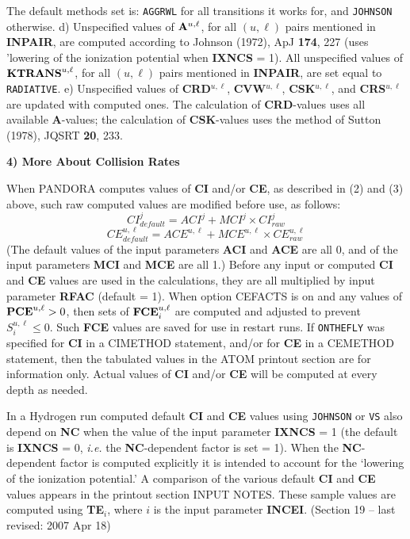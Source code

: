 The default methods set is: {\tt AGGRWL} for all transitions it works for,
and {\tt JOHNSON} otherwise.
\blankline
d) Unspecified values of ${\bf A}^{u,\ell}$, for all $(u,\ell)$ pairs
mentioned in {\bf INPAIR}, are computed according to Johnson (1972), ApJ
{\bf 174}, 227 (uses 'lowering of the ionization potential when
{\bf IXNCS} = 1). All unspecified values of ${\bf KTRANS}^{u,\ell}$, for
all $(u,\ell)$ pairs mentioned in {\bf INPAIR}, are set equal to 
{\tt RADIATIVE}.
\blankline
e) Unspecified values of {\bf CRD}$^{u,\ell}$, {\bf CVW}$^{u,\ell}$,
{\bf CSK}$^{u,\ell}$, and {\bf CRS}$^{u,\ell}$ are updated with computed ones.
The calculation of {\bf CRD}-values uses all available {\bf A}-values;
the calculation of {\bf CSK}-values uses the method of Sutton (1978),
JQSRT {\bf 20}, 233.
\ej
\centerline{\bf 4) More About Collision Rates}
\blankline
When PANDORA computes values of {\bf CI} and/or {\bf CE},
as described in (2) and (3) above, such raw computed values are modified
before use, as follows:
$$CI^j_{default} = ACI^j + MCI^j \times CI^j_{raw}$$
$$CE^{u,\ell}_{default} = ACE^{u,\ell} + MCE^{u,\ell} \times CE^{u,\ell}_{raw}$$
(The default values of the input parameters {\bf ACI} and {\bf ACE} are all 0,
and of the input parameters {\bf MCI} and {\bf MCE} are all 1.)
\blankline
\blankline
Before any input or computed {\bf CI} and {\bf CE} values are used in
the calculations, they are all multiplied by input parameter {\bf RFAC}
(default = 1).
\blankline
\blankline
When option CEFACTS is on and any values of ${\bf PCE}^{u, \ell} > 0$, then
sets of ${\bf FCE}^{u, \ell}_i$ are computed and adjusted to prevent
$S^{u, \ell}_i \leq 0$. Such {\bf FCE} values are saved for use in restart runs.
\blankline
\blankline
If {\tt ONTHEFLY} was specified for {\bf CI} in a CIMETHOD statement, and/or
for {\bf CE} in a CEMETHOD statement, then the tabulated values in the ATOM
printout section are for information only. Actual values of {\bf CI} and/or
{\bf CE} will be computed at every depth as needed.

In a Hydrogen run computed default {\bf CI} and {\bf CE} values using
{\tt JOHNSON} or {\tt VS} also depend on {\bf NC} when the value of the input
parameter {\bf IXNCS} = 1 (the default is {\bf IXNCS} = 0, {\it i.e.} the
{\bf NC}-dependent factor is set = 1). When the {\bf NC}-dependent factor
is computed explicitly it is intended to account for the `lowering of the
ionization potential.'
\blankline
\blankline
A comparison of the various default {\bf CI} and {\bf CE} values appears
in the printout section INPUT NOTES. These sample values are computed using
{\bf TE}$_i$, where $i$ is the input parameter {\bf INCEI}.
\vfill
\noindent (Section 19 -- last revised: 2007 Apr 18) %
{}
\ej
